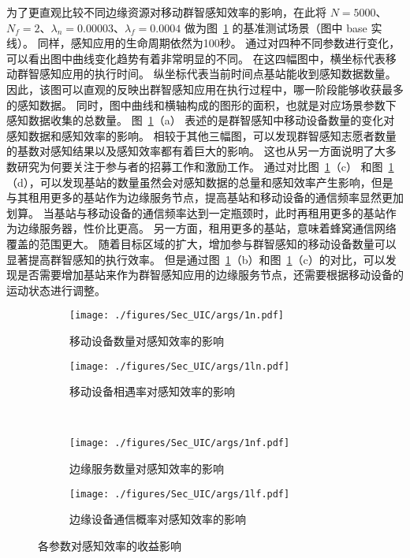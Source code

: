 为了更直观比较不同边缘资源对移动群智感知效率的影响，在此将 $N=5000$、$N_f=2$、$\lambda_n = 0.00003$、$\lambda_f=0.0004$ 做为图~\ref{Figure_SingleVal} 的基准测试场景（图中 base 实线）。
同样，感知应用的生命周期依然为100秒。
通过对四种不同参数进行变化，可以看出图中曲线变化趋势有着非常明显的不同。
在这四幅图中，横坐标代表移动群智感知应用的执行时间。
纵坐标代表当前时间点基站能收到感知数据数量。
因此，该图可以直观的反映出群智感知应用在执行过程中，哪一阶段能够收获最多的感知数据。
同时，图中曲线和横轴构成的图形的面积，也就是对应场景参数下感知数据收集的总数量。
图~\ref{Figure_SingleVal}（a） 表述的是群智感知中移动设备数量的变化对感知数据和感知效率的影响。
相较于其他三幅图，可以发现群智感知志愿者数量的基数对感知结果以及感知效率都有着巨大的影响。
这也从另一方面说明了大多数研究为何要关注于参与者的招募工作和激励工作。
通过对比图~\ref{Figure_SingleVal}（c） 和图~\ref{Figure_SingleVal}（d），可以发现基站的数量虽然会对感知数据的总量和感知效率产生影响，但是与其租用更多的基站作为边缘服务节点，提高基站和移动设备的通信频率显然更加划算。
当基站与移动设备的通信频率达到一定瓶颈时，此时再租用更多的基站作为边缘服务器，性价比更高。
另一方面，租用更多的基站，意味着蜂窝通信网络覆盖的范围更大。
随着目标区域的扩大，增加参与群智感知的移动设备数量可以显著提高群智感知的执行效率。
但是通过图~\ref{Figure_SingleVal}（b）和图~\ref{Figure_SingleVal}（c）的对比，可以发现是否需要增加基站来作为群智感知应用的边缘服务节点，还需要根据移动设备的运动状态进行调整。

\begin{figure}[!h]
  \centering
  \begin{subfigure}[t]{0.48\linewidth}
    \texttt{[image: ./figures/Sec\_UIC/args/1n.pdf]}
    \vspace{-1.5em}
    \caption{移动设备数量对感知效率的影响}
  \end{subfigure}
  \begin{subfigure}[t]{0.48\linewidth}
    \texttt{[image: ./figures/Sec\_UIC/args/1ln.pdf]}
    \vspace{-1.5em}
    \caption{移动设备相遇率对感知效率的影响}
  \end{subfigure}\\
  \begin{subfigure}[b]{0.48\linewidth}
    \texttt{[image: ./figures/Sec\_UIC/args/1nf.pdf]}
    \vspace{-1.5em}
    \caption{边缘服务数量对感知效率的影响}
  \end{subfigure}
  \begin{subfigure}[b]{0.48\linewidth}
    \texttt{[image: ./figures/Sec\_UIC/args/1lf.pdf]}
    \vspace{-1.5em}
    \caption{边缘设备通信概率对感知效率的影响}
  \end{subfigure}
	\caption{各参数对感知效率的收益影响}
	\label{Figure_SingleVal}
\end{figure}

